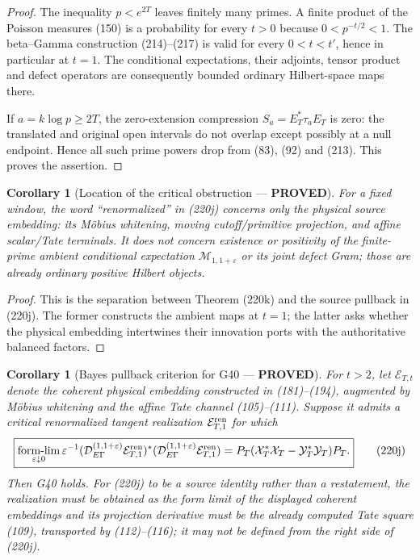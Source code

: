 \documentclass[11pt]{article}
\newtheorem{corollary}[theorem]{Corollary}
\newcommand{\PROVED}{\textcolor{green!45!black}{\textbf{PROVED}}}
\begin{document}
\begin{proof}
The inequality $p<e^{2T}$ leaves finitely many primes.  A finite product of
the Poisson measures (150) is a probability for every $t>0$ because
$0<p^{-t/2}<1$.  The beta--Gamma construction (214)--(217) is valid for every
$0<t<t'$, hence in particular at $t=1$.  The conditional expectations,
their adjoints, tensor product and defect operators are consequently bounded
ordinary Hilbert-space maps there.

If $a=k\log p\ge2T$, the zero-extension compression
$S_a=E_T^*\tau_aE_T$ is zero: the translated and original open intervals do
not overlap except possibly at a null endpoint.  Hence all such prime powers
drop from (83), (92) and (213).  This proves the assertion.
\end{proof}

\begin{corollary}[Location of the critical obstruction --- \PROVED]
For a fixed window, the word ``renormalized'' in (220j) concerns only the
physical source embedding: its M\"obius whitening, moving cutoff/primitive
projection, and affine scalar/Tate terminals.  It does not concern existence
or positivity of the finite-prime ambient conditional expectation
$\mathcal M_{1,1+\varepsilon}$ or its joint defect Gram; those are already
ordinary positive Hilbert objects.
\end{corollary}

\begin{proof}
This is the separation between Theorem (220k) and the source pullback in
(220j).  The former constructs the ambient maps at $t=1$; the latter asks
whether the physical embedding intertwines their innovation ports with the
authoritative balanced factors.
\end{proof}

\begin{corollary}[Bayes pullback criterion for G40 --- \PROVED]
For $t>2$, let $\mathcal E_{T,t}$ denote the coherent physical embedding
constructed in (181)--(194), augmented by M\"obius whitening and the affine
Tate channel (105)--(111).  Suppose it admits a critical renormalized tangent
realization $\mathcal E_{T,1}^{\rm ren}$ for which
\begin{equation}
 \boxed{
 \operatorname*{form-lim}_{\varepsilon\downarrow0}
 \varepsilon^{-1}
 (\mathcal D_{E\Gamma}^{(1,1+\varepsilon)}
       \mathcal E_{T,1}^{\rm ren})^*
 (\mathcal D_{E\Gamma}^{(1,1+\varepsilon)}
       \mathcal E_{T,1}^{\rm ren})
 =P_T(\mathcal X_T^*\mathcal X_T
             -\mathcal Y_T^*\mathcal Y_T)P_T.}       \tag{220j}
\end{equation}
Then G40 holds.  For (220j) to be a source identity rather than a restatement,
the realization must be obtained as the form limit of the displayed coherent
embeddings and its projection derivative must be the already computed Tate
square (109), transported by (112)--(116); it may not be defined from the
right side of (220j).
\end{corollary}
\end{document}
